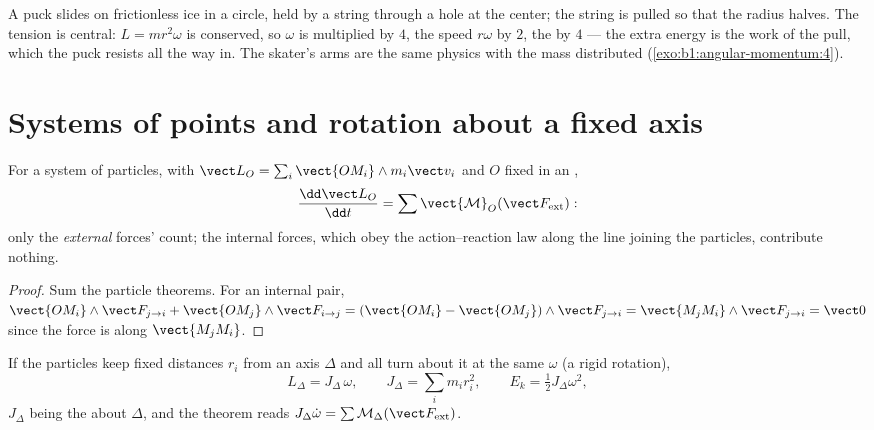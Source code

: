 \begin{example}\label{ex:b1:angular-momentum:puck}
A puck slides on frictionless ice in a circle, held by a string through
a hole at the center; the string is pulled so that the radius halves.
The tension is central: $L = mr^2\omega$ is conserved, so $\omega$ is
multiplied by $4$, the speed $r\omega$ by $2$, the  by $4$
--- the extra energy is the work of the pull, which the puck resists
all the way in. The skater's arms are the same physics with the mass
distributed (\cref{exo:b1:angular-momentum:4}).
\end{example}

\section{Systems of points and rotation about a fixed axis}

\begin{theorem}\label{thm:b1:angular-momentum:system}
For a system of particles, with $\vect L_O = \sum_i\vect{OM_i}\wedge m_i\vect v_i$
and $O$ fixed in an ,
\[
\frac{\dd\vect L_O}{\dd t} = \sum\vect{\mathcal M}_O(\vect F_{\mathrm{ext}}):
\]
only the \emph{external} forces'  count; the internal forces,
which obey the action--reaction law along the line joining the
particles, contribute nothing.
\end{theorem}

\begin{proof}
Sum the particle theorems. For an internal pair, $\vect{OM_i}\wedge\vect F_{j\to i}
+ \vect{OM_j}\wedge\vect F_{i\to j} = (\vect{OM_i} - \vect{OM_j})\wedge\vect F_{j\to i}
= \vect{M_jM_i}\wedge\vect F_{j\to i} = \vect 0$ since the force is along
$\vect{M_jM_i}$.
\end{proof}

\begin{proposition}\label{prop:b1:angular-momentum:inertia}
If the particles keep fixed distances $r_i$ from an axis $\Delta$ and all
turn about it at the same  $\omega$ (a rigid rotation),
\[
L_\Delta = J_\Delta\,\omega, \qquad J_\Delta = \sum_i m_ir_i^2, \qquad
E_k = \tfrac12 J_\Delta\omega^2,
\]
$J_\Delta$ being the \emph{} about $\Delta$, and the
theorem reads $J_\Delta\dot\omega = \sum\mathcal M_\Delta(\vect F_{\mathrm{ext}})$.
\end{proposition}

